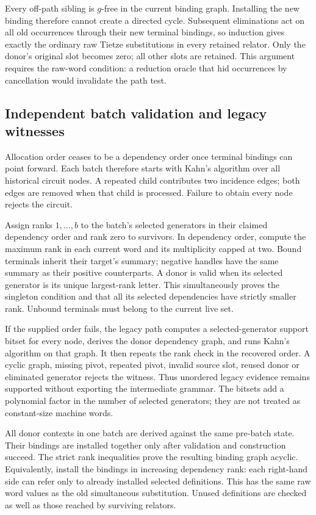 Every off-path sibling is $g$-free in the current binding graph. Installing
the new binding therefore cannot create a directed cycle. Subsequent
eliminations act on all old occurrences through their new terminal bindings,
so induction gives exactly the ordinary raw Tietze substitutions in every
retained relator. Only the donor's original slot becomes zero; all other slots
are retained. This argument requires the raw-word condition: a reduction
oracle that hid occurrences by cancellation would invalidate the path test.

\subsection{Independent batch validation and legacy witnesses}

Allocation order ceases to be a dependency order once terminal bindings can
point forward. Each batch therefore starts with Kahn's algorithm over all
historical circuit nodes. A repeated child contributes two incidence edges;
both edges are removed when that child is processed. Failure to obtain every
node rejects the circuit.

Assign ranks $1,\ldots,b$ to the batch's selected generators in their claimed
dependency order and rank zero to survivors. In dependency order, compute
the maximum rank in each current word and its multiplicity capped at two.
Bound terminals inherit their target's summary; negative handles have the
same summary as their positive counterparts. A donor is valid when its
selected generator is its unique largest-rank letter. This simultaneously
proves the singleton condition and that all its selected dependencies have
strictly smaller rank. Unbound terminals must belong to the current live set.

If the supplied order fails, the legacy path computes a selected-generator
support bitset for every node, derives the donor dependency graph, and runs
Kahn's algorithm on that graph. It then repeats the rank check in the recovered
order. A cyclic graph, missing pivot, repeated pivot, invalid source slot,
reused donor or eliminated generator rejects the witness. Thus unordered
legacy evidence remains supported without exporting the intermediate grammar.
The bitsets add a polynomial factor in the number of selected generators;
they are not treated as constant-size machine words.

All donor contexts in one batch are derived against the same pre-batch state.
Their bindings are installed together only after validation and construction
succeed. The strict rank inequalities prove the resulting binding graph
acyclic. Equivalently, install the bindings in increasing dependency rank:
each right-hand side can refer only to already installed selected definitions.
This has the same raw word values as the old simultaneous substitution.
Unused definitions are checked as well as those reached by surviving relators.

